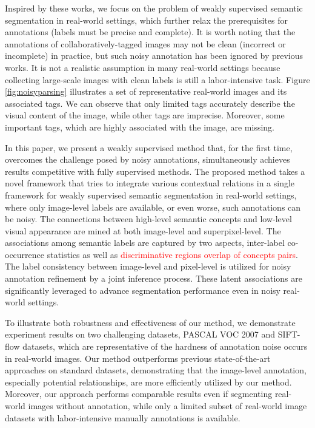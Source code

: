 Inspired by these works, we focus on the problem of weakly supervised semantic segmentation in real-world settings, which further relax the prerequisites for annotations (\eg labels must be precise and complete). It is worth noting that the annotations of collaboratively-tagged images may not be clean (incorrect or incomplete) in practice, but such noisy annotation has been ignored by previous works. It is not a realistic assumption in many real-world settings because collecting large-scale images with clean labels is still a labor-intensive task. Figure \ref{fig:noisyparsing} illustrates a set of representative real-world images and its associated tags. We can observe that only limited tags accurately describe the visual content of the image, while other tags are imprecise. Moreover, some important tags, which are highly associated with the image, are missing.

In this paper, we present a weakly supervised method that, for the first time, overcomes the challenge posed by noisy annotations, simultaneously achieves results competitive with fully supervised methods. The proposed method takes a novel framework that tries to integrate various contextual relations in a single framework for weakly supervised semantic segmentation in real-world settings, where only image-level labels are available, or even worse, such annotations can be noisy. The connections between high-level semantic concepts and low-level visual appearance are mined at both image-level and superpixel-level. The associations among semantic labels are captured by two aspects, inter-label co-occurrence statistics as well as \textcolor{red}{discriminative regions overlap of concepts pairs}. The label consistency between image-level and pixel-level is utilized for noisy annotation refinement by a joint inference process. These latent associations are significantly leveraged to advance segmentation performance even in noisy real-world settings.

To illustrate both robustness and effectiveness of our method, we demonstrate experiment results on two challenging datasets, PASCAL VOC 2007 and SIFT-flow datasets,  which are representative of the hardness of annotation noise occurs in real-world images. Our method outperforms previous state-of-the-art approaches on standard datasets, demonstrating that the image-level annotation, especially potential relationships, are more efficiently utilized by our method. 
\if
Moreover, our approach performs comparable results even if segmenting real-world images without annotation, while only a limited subset of real-world image datasets with labor-intensive manually annotations is available.
\fi

